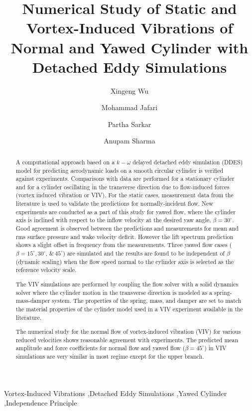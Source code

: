 \documentclass[12pt,authoryear]{elsarticle}
\begin{document}
\begin{frontmatter}

\title{Numerical Study of Static and Vortex-Induced Vibrations of Normal and Yawed Cylinder with Detached Eddy Simulations}


\author[1]{Xingeng Wu}
\author[1]{Mohammad Jafari} 
\author[2]{Partha Sarkar}
\author[3]{Anupam Sharma}

\address{Department of Aerospace Engineering, Iowa State University, Ames, Iowa, 50011}

\begin{abstract}
A computational approach based on a $k-\omega$ delayed detached eddy simulation
(DDES) model for predicting aerodynamic loads on a smooth circular cylinder is
verified against experiments. Comparisons with data are performed for a
stationary cylinder and for a cylinder oscillating in the transverse direction
due to flow-induced forces (vortex induced vibration or VIV). For the static
cases, measurement data from the literature is used to validate the predictions
for normally-incident flow. New experiments are conducted as a part of this
study for yawed flow, where the cylinder axis is inclined with respect to the
inflow velocity at the desired yaw angle, $\beta=30^\circ$. Good agreement is
observed between the predictions and measurements for mean and rms surface
pressure and wake velocity deficit. However the lift spectrum prediction shows
a slight offset in frequency from the measurements.  Three yawed flow cases
($\beta=15^\circ, 30^\circ, \,\&\, 45^\circ$) are simulated and the results are
found to be independent of $\beta$ (dynamic scaling) when the flow speed normal
to the cylinder axis is selected as the reference velocity scale.  

The VIV simulations are performed by coupling the flow solver with a solid
dynamics solver where the cylinder motion in the transverse direction is
modeled as a spring-mass-damper system. The properties of the spring, mass, and
damper are set to match the material properties of the cylinder model used in a
VIV experiment available in the literature.

The numerical study for the normal flow of vortex-induced vibration (VIV) for
various reduced velocities shows reasonable agreement with experiments. The
predicted mean amplitude and force coefficients for normal flow and yawed flow
($\beta=45^\circ$) in VIV simulations are very similar in most regime except
for the upper branch.
\end{abstract}

\begin{keyword}
  Vortex-Induced Vibrations \sep Detached Eddy Simulations \sep Yawed Cylinder \sep Independence Principle
\end{keyword}
\end{frontmatter}
\end{document}
